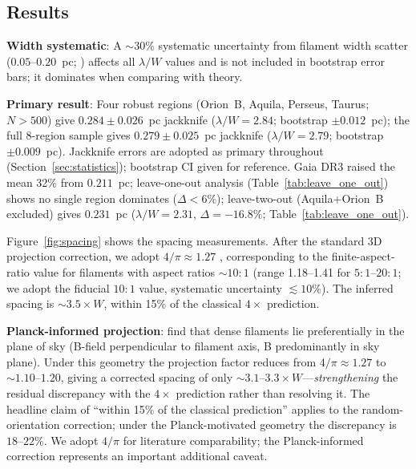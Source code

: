 \documentclass[twoside,twocolumn]{mnras}
\begin{document}
\subsection{Results}
\label{sec:results}

\textbf{Width systematic}: A $\sim$30\% systematic uncertainty from filament width
scatter ($0.05$--$0.20$~pc; \citealt{Panopoulou2022}) affects all $\lambda/W$ values
and is not included in bootstrap error bars; it dominates when comparing with theory.

\textbf{Primary result}: Four robust regions (Orion~B, Aquila, Perseus, Taurus;
$N > 500$) give $0.284 \pm 0.026$~pc jackknife ($\lambda/W = 2.84$; bootstrap
$\pm 0.012$~pc); the full 8-region sample gives $0.279 \pm 0.025$~pc jackknife
($\lambda/W = 2.79$; bootstrap $\pm 0.009$~pc). Jackknife errors are adopted as
primary throughout (Section~\ref{sec:statistics}); bootstrap CI given for reference.
Gaia DR3 raised the mean 32\% from $0.211$~pc; leave-one-out analysis
(Table~\ref{tab:leave_one_out}) shows no single region dominates ($\Delta < 6\%$);
leave-two-out (Aquila+Orion~B excluded) gives $0.231$~pc ($\lambda/W = 2.31$,
$\Delta = -16.8\%$; Table~\ref{tab:leave_one_out}).

Figure~\ref{fig:spacing} shows the spacing measurements. After the standard 3D projection
correction, we adopt $4/\pi \approx 1.27$ \citep{Andre2010}, corresponding to the
\citet{Hacar2013} finite-aspect-ratio value for filaments with aspect ratios ${\sim}10{:}1$
(range 1.18--1.41 for $5{:}1$--$20{:}1$; we adopt the fiducial $10{:}1$ value, systematic
uncertainty $\lesssim 10\%$). The inferred spacing is ${\sim}3.5\times W$, within 15\%
of the classical $4\times$ prediction.

\textbf{Planck-informed projection}: \citet{Planck2016} find that dense filaments lie
preferentially in the plane of sky (B-field perpendicular to filament axis, B
predominantly in sky plane). Under this geometry the projection factor reduces from
$4/\pi \approx 1.27$ to ${\sim}1.10$--$1.20$, giving a corrected spacing of only
${\sim}3.1$--$3.3\times W$---\textit{strengthening} the residual discrepancy with the
$4\times$ prediction \citep{Inutsuka1992} rather than resolving it. The headline claim
of ``within 15\% of the classical prediction'' applies to the random-orientation
correction; under the Planck-motivated geometry the discrepancy is $18$--$22\%$.
We adopt $4/\pi$ for literature comparability; the Planck-informed correction
represents an important additional caveat.
\end{document}
